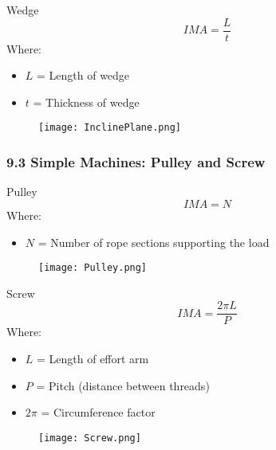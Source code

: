 \documentclass{beamer}
\begin{document}
\begin{frame}


\begin{block}{Wedge}
$$IMA = \frac{L}{t}$$
Where:
\begin{itemize}
\item $L$ = Length of wedge
\item $t$ = Thickness of wedge
\end{itemize}
\end{block}
\begin{figure}
    \centering
    \texttt{[image: InclinePlane.png]}
\end{figure}
\end{frame}

\begin{frame}
\frametitle{9.3 Simple Machines: Pulley and Screw}
\begin{block}{Pulley}
$$IMA = N$$
Where:
\begin{itemize}
\item $N$ = Number of rope sections supporting the load
\end{itemize}
\end{block}
\begin{figure}
    \centering
    \texttt{[image: Pulley.png]}
\end{figure}
\end{frame}

\begin{frame}
\begin{block}{Screw}
$$IMA = \frac{2\pi L}{P}$$
Where:
\begin{itemize}
\item $L$ = Length of effort arm
\item $P$ = Pitch (distance between threads)
\item $2\pi$ = Circumference factor
\end{itemize}
\end{block}
\begin{figure}
    \centering
    \texttt{[image: Screw.png]}
\end{figure}
\end{frame}
\end{document}
